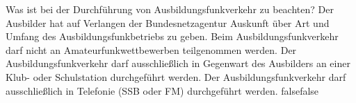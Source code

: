     {Was ist bei der Durchführung von Ausbildungsfunkverkehr zu beachten?}
    {Der  Ausbilder  hat  auf  Verlangen  der  Bundesnetzagentur  Auskunft  über  Art  und  Umfang  des 
Ausbildungsfunkbetriebs zu geben.}
    {Beim Ausbildungsfunkverkehr darf nicht an Amateurfunkwettbewerben teilgenommen werden.}
    {Der Ausbildungsfunkverkehr darf ausschließlich in Gegenwart des Ausbilders an einer Klub- oder Schulstation durchgeführt werden.}
    {Der Ausbildungsfunkverkehr darf ausschließlich in Telefonie (SSB oder FM) durchgeführt werden.}
    {false}{false}